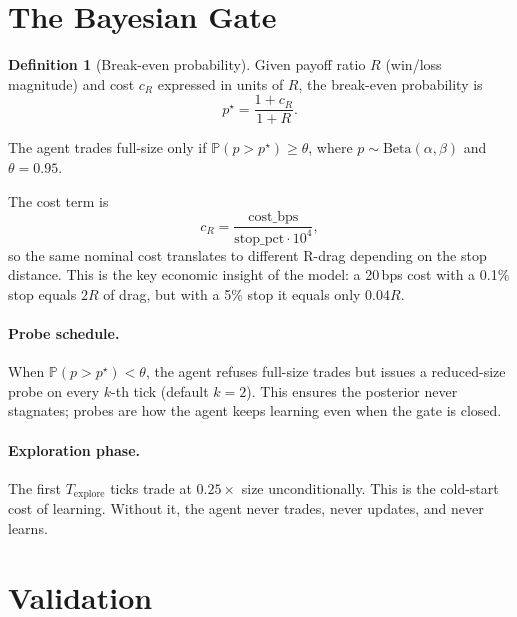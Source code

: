 \documentclass[11pt,a4paper]{article}
\newcommand{\cel}[1]{\textcolor{celadon}{#1}}
\theoremstyle{definition}
\newtheorem{definition}{Definition}
\begin{document}
\section{The Bayesian Gate}
\label{sec:gate}

\begin{definition}[Break-even probability]
Given payoff ratio $R$ (win/loss magnitude) and cost $c_R$ expressed in units of $R$, the break-even probability is
\begin{equation}
p^\star = \frac{1 + c_R}{1 + R}.
\end{equation}
\end{definition}

The agent trades full-size only if $\mathbb{P}(p > p^\star) \geq \theta$, where $p \sim \mathrm{Beta}(\alpha, \beta)$ and $\theta = 0.95$.

The cost term is
\begin{equation}
c_R = \frac{\mathrm{cost\_bps}}{\mathrm{stop\_pct} \cdot 10^4},
\end{equation}
so the same nominal cost translates to different R-drag depending on the stop distance. This is the key economic insight of the model: a 20\,bps cost with a 0.1\% stop equals $2R$ of drag, but with a 5\% stop it equals only $0.04R$.

\paragraph{Probe schedule.}
When $\mathbb{P}(p > p^\star) < \theta$, the agent refuses full-size trades but issues a reduced-size \cel{probe} on every $k$-th tick (default $k=2$). This ensures the posterior never stagnates; probes are how the agent keeps learning even when the gate is closed.

\paragraph{Exploration phase.}
The first $T_\mathrm{explore}$ ticks trade at $0.25\times$ size unconditionally. This is the cold-start cost of learning. Without it, the agent never trades, never updates, and never learns.

\section{Validation}
\label{sec:validation}
\end{document}
